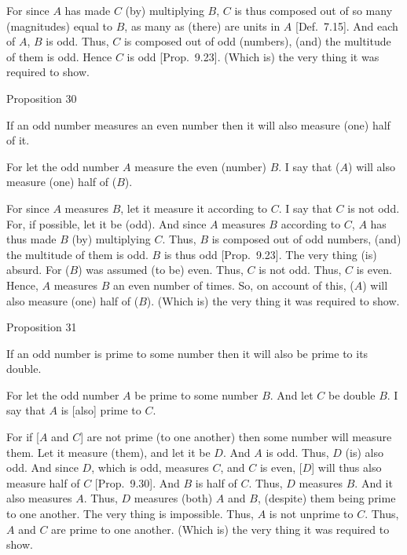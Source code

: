 For since $A$ has made $C$ (by) multiplying $B$, $C$ is thus composed  out of so many (magnitudes) equal to $B$, as many as (there) are  units in $A$ [Def.~7.15]. And each of $A$, $B$ is odd. Thus, $C$ is composed
out of odd (numbers), (and) the multitude of them is odd.   
Hence $C$ is odd [Prop.~9.23]. (Which is) the very thing it was required to show.


\begin{center}
{\large Proposition 30}
\end{center}

If an odd number measures an even number then it
will also measure (one) half of it.

\epsfysize=0.8in
\centerline{}

For let the odd number $A$ measure the even (number) $B$. I say that
($A$) will also measure (one) half of ($B$).

For since $A$ measures $B$, let it measure it according to $C$. I say that
$C$ is not odd. For, if possible, let it be (odd). And since $A$ measures $B$ according to $C$, $A$ has thus made $B$ (by) multiplying $C$. Thus, $B$
is composed out of odd numbers, (and) the multitude of them is odd. $B$
is thus odd [Prop.~9.23]. The very thing (is)
absurd. For ($B$) was assumed (to be) even. Thus, $C$ is not odd.
Thus, $C$ is even. Hence, $A$ measures $B$ an even number of times.
So, on account of this, ($A$) will also measure (one) half of ($B$).
(Which is) the very thing it was required to show.


\begin{center}
{\large Proposition 31}
\end{center}

If an odd number is prime to some number then it
will also be prime to its double.

\epsfysize=1.1in
\centerline{}

For let the odd number $A$ be prime to some number $B$. And let $C$ be
double $B$. I say that $A$ is [also] prime to $C$.

For if [$A$ and $C$] are not prime (to one another) then some number
will measure them. Let it measure (them), and let it be $D$. And
$A$ is odd. Thus, $D$ (is) also odd. And since $D$, which is odd, measures
$C$, and $C$ is even, [$D$] will thus also measure half of $C$ [Prop.~9.30]. 
And $B$ is half of $C$.  Thus, $D$ measures $B$. And it also measures
$A$. Thus, $D$ measures (both) $A$ and $B$, (despite) them being prime to one another. The very thing is impossible. Thus, $A$ is not unprime 
to $C$. Thus, $A$ and $C$ are prime to one another. (Which is) the very thing it
was required to show.

